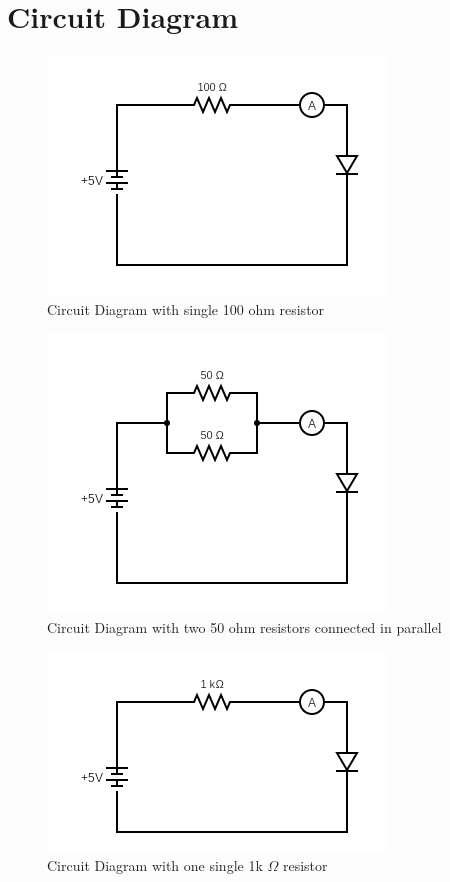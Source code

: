 \section{Circuit Diagram}
\begin{figure}[H]
    \centering
    \includegraphics[scale=0.6]{src/exp02/circuit (5).png}
    \caption{Circuit Diagram with single 100 ohm resistor}
\end{figure}

\begin{figure}[H]
    \centering
    \includegraphics[scale=0.6]{src/exp02/circuit (7).png}
    \caption{Circuit Diagram with two 50 ohm resistors connected in parallel}
\end{figure}

\begin{figure}[H]
    \centering
    \includegraphics[scale=0.6]{src/exp02/circuit (8).png}
    \caption{Circuit Diagram with one single 1k $\Omega $ resistor}
\end{figure}

